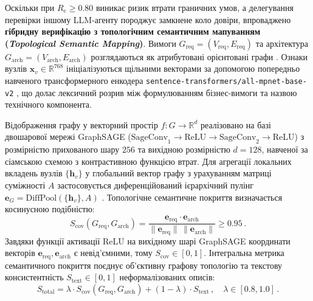 \documentclass[12pt, reqno, a4paper]{amsart}
\theoremstyle{definition}
\theoremstyle{plain}
\theoremstyle{plain}
\theoremstyle{plain}
\theoremstyle{remark}
\theoremstyle{plain}
\begin{document}
{Оскільки при $R_{\text{c}} \ge 0.80$ виникає ризик втрати граничних умов, а делегування перевірки іншому LLM-агенту породжує замкнене коло довіри, впроваджено \textbf{гібридну верифікацію з топологічним семантичним мапуванням (\textit{Topological Semantic Mapping})}. Вимоги $G_{\text{req}} = (V_{\text{req}}, E_{\text{req}})$ та архітектура $G_{\text{arch}} = (V_{\text{arch}}, E_{\text{arch}})$ розглядаються як атрибутовані орієнтовані графи \cite{bib15}. Ознаки вузлів $\mathbf{x}_v \in \mathbb{R}^{768}$ ініціалізуються щільними векторами за допомогою попередньо навченого трансформерного енкодера \texttt{sentence-\allowbreak transformers/\allowbreak all-\allowbreak mpnet-\allowbreak base-\allowbreak v2} \cite{bib24}, що долає лексичний розрив між формулюванням бізнес-вимоги та назвою технічного компонента.

Відображення графу у векторний простір $f: G \to \mathbb{R}^d$ реалізовано на базі двошарової мережі GraphSAGE \cite{bib13} ($\text{SageConv}_1 \to \text{ReLU} \to \text{SageConv}_2 \to \text{ReLU}$) з розмірністю прихованого шару $256$ та вихідною розмірністю $d = 128$, навченої за сіамською схемою з контрастивною функцією втрат. Для агрегації локальних вкладень вузлів $\{\mathbf{h}_v\}$ у глобальний вектор графу з урахуванням матриці суміжності $A$ застосовується диференційований ієрархічний пулінг $\mathbf{e}_G = \text{DiffPool}(\{\mathbf{h}_v\}, A)$ \cite{bib14}. Топологічне семантичне покриття визначається косинусною подібністю:
\begin{equation}
\label{eq:scov}
S_{\text{cov}}(G_{\text{req}}, G_{\text{arch}}) = \frac{\mathbf{e}_{\text{req}} \cdot \mathbf{e}_{\text{arch}}}{\|\mathbf{e}_{\text{req}}\| \, \|\mathbf{e}_{\text{arch}}\|} \ge 0.95\, .
\end{equation}
Завдяки функції активації ReLU на вихідному шарі GraphSAGE координати векторів $\mathbf{e}_{\text{req}}, \mathbf{e}_{\text{arch}}$ є невід'ємними, тому $S_{\text{cov}} \in [0, 1]$. Інтегральна метрика семантичного покриття поєднує об'єктивну графову топологію та текстову консистентність $S_{\text{text}} \in [0, 1]$ неформалізованих описів:
\begin{equation}
\label{eq:stotal}
S_{\text{total}} = \lambda \cdot S_{\text{cov}}(G_{\text{req}}, G_{\text{arch}}) + (1 - \lambda) \cdot S_{\text{text}}\, , \quad \lambda \in [0.8, 1.0]\, .
\end{equation}

}
\end{document}
